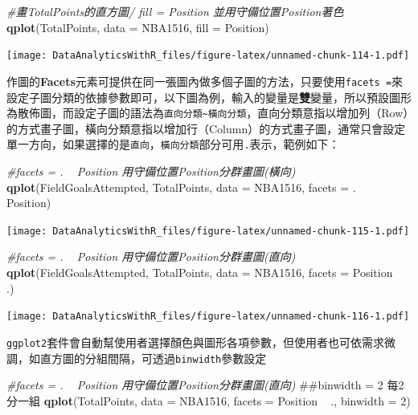 \documentclass[]{book}
\newenvironment{Shaded}{\begin{snugshade}}{\end{snugshade}}
\newcommand{\KeywordTok}[1]{\textcolor[rgb]{0.13,0.29,0.53}{\textbf{{#1}}}}
\newcommand{\DataTypeTok}[1]{\textcolor[rgb]{0.13,0.29,0.53}{{#1}}}
\newcommand{\DecValTok}[1]{\textcolor[rgb]{0.00,0.00,0.81}{{#1}}}
\newcommand{\StringTok}[1]{\textcolor[rgb]{0.31,0.60,0.02}{{#1}}}
\newcommand{\CommentTok}[1]{\textcolor[rgb]{0.56,0.35,0.01}{\textit{{#1}}}}
\newcommand{\NormalTok}[1]{{#1}}
\theoremstyle{definition}
\theoremstyle{definition}
\theoremstyle{remark}
\begin{document}
\begin{Shaded}
\begin{Highlighting}[]
\CommentTok{#畫TotalPoints的直方圖/ fill = Position 並用守備位置Position著色}
\KeywordTok{qplot}\NormalTok{(TotalPoints, }\DataTypeTok{data =} \NormalTok{NBA1516, }\DataTypeTok{fill =} \NormalTok{Position)}
\end{Highlighting}
\end{Shaded}

\texttt{[image: DataAnalyticsWithR\_files/figure-latex/unnamed-chunk-114-1.pdf]}

作圖的\textbf{Facets}元素可提供在同一張圖內做多個子圖的方法，只要使用\texttt{facets\ =}來設定子圖分類的依據參數即可，以下圖為例，輸入的變量是\textbf{雙}變量，所以預設圖形為散佈圖，而設定子圖的語法為\texttt{直向分類\textasciitilde{}橫向分類}，直向分類意指以增加列（Row）的方式畫子圖，橫向分類意指以增加行（Column）的方式畫子圖，通常只會設定單一方向，如果選擇的是\texttt{直向}，\texttt{橫向分類}部分可用\texttt{.}表示，範例如下：

\begin{Shaded}
\begin{Highlighting}[]
\CommentTok{#facets = . ~ Position 用守備位置Position分群畫圖(橫向)}
\KeywordTok{qplot}\NormalTok{(FieldGoalsAttempted, TotalPoints, }
      \DataTypeTok{data =} \NormalTok{NBA1516,}
      \DataTypeTok{facets =} \NormalTok{. ~}\StringTok{ }\NormalTok{Position)}
\end{Highlighting}
\end{Shaded}

\texttt{[image: DataAnalyticsWithR\_files/figure-latex/unnamed-chunk-115-1.pdf]}

\begin{Shaded}
\begin{Highlighting}[]
\CommentTok{#facets = . ~ Position 用守備位置Position分群畫圖(直向)}
\KeywordTok{qplot}\NormalTok{(FieldGoalsAttempted, TotalPoints, }
      \DataTypeTok{data =} \NormalTok{NBA1516,}
      \DataTypeTok{facets =} \NormalTok{Position ~}\StringTok{ }\NormalTok{.)}
\end{Highlighting}
\end{Shaded}

\texttt{[image: DataAnalyticsWithR\_files/figure-latex/unnamed-chunk-116-1.pdf]}

\texttt{ggplot2}套件會自動幫使用者選擇顏色與圖形各項參數，但使用者也可依需求微調，如直方圖的分組間隔，可透過\texttt{binwidth}參數設定

\begin{Shaded}
\begin{Highlighting}[]
\CommentTok{#facets = . ~ Position 用守備位置Position分群畫圖(直向)}
\NormalTok{##binwidth = 2 每2分一組}
\KeywordTok{qplot}\NormalTok{(TotalPoints, }\DataTypeTok{data =} \NormalTok{NBA1516, }
      \DataTypeTok{facets =} \NormalTok{Position ~}\StringTok{ }\NormalTok{., }\DataTypeTok{binwidth =} \DecValTok{2}\NormalTok{)}
\end{Highlighting}
\end{Shaded}
\end{document}
